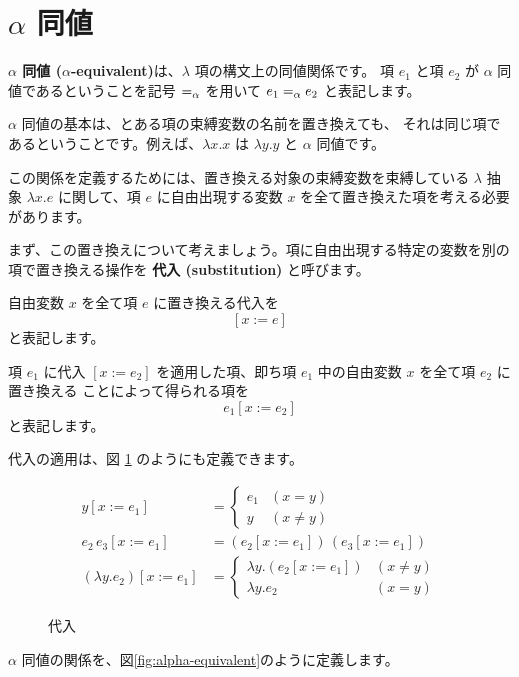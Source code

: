\section{$\alpha$ 同値}

\textbf{$\alpha$ 同値 ($\alpha$-equivalent)}は、$\lambda$ 項の構文上の同値関係です。
項 $e_1$ と項 $e_2$ が $\alpha$ 同値であるということを記号 $=_\alpha$ を用いて
$e_1 =_\alpha e_2$ と表記します。

$\alpha$ 同値の基本は、とある項の束縛変数の名前を置き換えても、
それは同じ項であるということです。例えば、$\lambda x . x$ は $\lambda y . y$ と $\alpha$ 同値です。

この関係を定義するためには、置き換える対象の束縛変数を束縛している $\lambda$ 抽象
$\lambda x . e$ に関して、項 $e$ に自由出現する変数 $x$ を全て置き換えた項を考える必要があります。

まず、この置き換えについて考えましょう。項に自由出現する特定の変数を別の項で置き換える操作を
\textbf{代入 (substitution)} と呼びます。

自由変数 $x$ を全て項 $e$ に置き換える代入を
\[
  [x := e]
\]
と表記します。

項 $e_1$ に代入 $[x := e_2]$ を適用した項、即ち項 $e_1$ 中の自由変数 $x$ を全て項 $e_2$ に置き換える
ことによって得られる項を
\[
  e_1 [x := e_2]
\]
と表記します。

代入の適用は、図 \ref{fig:lambda-substitute} のようにも定義できます。

\begin{figure}[htbp]
  \begin{align*}
    y [x := e_1] & = \left \{
      \begin{array}{ll}
        e_1 & (x = y) \\
        y & (x \neq y)
      \end{array}
      \right. \\
    e_2 \, e_3 [x := e_1] & = (e_2 [x := e_1]) \, (e_3 [x := e_1]) \\
    (\lambda y . e_2) [x := e_1] & = \left \{
      \begin{array}{ll}
        \lambda y . (e_2 [x := e_1]) & (x \neq y) \\
        \lambda y . e_2 & (x = y)
      \end{array}
      \right.
  \end{align*}
  \caption{代入}
  \label{fig:lambda-substitute}
\end{figure}

$\alpha$ 同値の関係を、図\ref{fig:alpha-equivalent}のように定義します。

